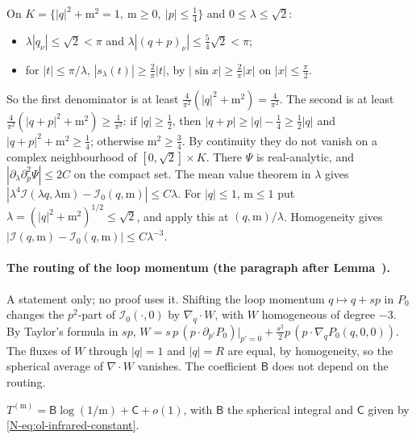 \begin{step}[Compactness]
On $K=\{|q|^2+\mathrm m^2=1,\ \mathrm m\ge0,\ |p|\le\frac14\}$ and $0\le\lambda\le\sqrt2$:
\begin{itemize}
\item $\lambda|q_\nu|\le\sqrt2<\pi$ and $\lambda|(q+p)_\nu|\le\frac54\sqrt2<\pi$;
\item for $|t|\le\pi/\lambda$, $|s_\lambda(t)|\ge\frac2\pi|t|$, by $|\sin x|\ge\frac2\pi|x|$ on $|x|\le\frac\pi2$.
\end{itemize}
So the first denominator is at least $\frac4{\pi^2}(|q|^2+\mathrm m^2)=\frac4{\pi^2}$. The second is at least $\frac4{\pi^2}(|q+p|^2+\mathrm m^2)\ge\frac1{\pi^2}$: if $|q|\ge\frac12$, then $|q+p|\ge|q|-\frac14\ge\frac12|q|$ and $|q+p|^2+\mathrm m^2\ge\frac14$; otherwise $\mathrm m^2\ge\frac34$. By continuity they do not vanish on a complex neighbourhood of $[0,\sqrt2]\times K$. There $\Psi$ is real-analytic, and $|\partial_\lambda\partial_p^2\Psi|\le2C$ on the compact set. The mean value theorem in $\lambda$ gives $|\lambda^4\mathcal I(\lambda q,\lambda\mathrm m)-\mathcal I_0(q,\mathrm m)|\le C\lambda$. For $|q|\le1$, $\mathrm m\le1$ put $\lambda=(|q|^2+\mathrm m^2)^{1/2}\le\sqrt2$, and apply this at $(q,\mathrm m)/\lambda$. Homogeneity gives $|\mathcal I(q,\mathrm m)-\mathcal I_0(q,\mathrm m)|\le C\lambda^{-3}$.
\end{step}

\paragraph{The routing of the loop momentum (the paragraph after Lemma~).} A statement only; no proof uses it. Shifting the loop momentum $q\mapsto q+sp$ in $P_0$ changes the $p^2$-part of $\mathcal I_0(\cdot,0)$ by $\nabla_q\cdot W$, with $W$ homogeneous of degree $-3$. By Taylor's formula in $sp$, $W=s\,p\,(p\cdot\partial_{p'}P_0)|_{p'=0}+\frac{s^2}2p\,(p\cdot\nabla_qP_0(q,0,0))$. The fluxes of $W$ through $|q|=1$ and $|q|=R$ are equal, by homogeneity, so the spherical average of $\nabla\cdot W$ vanishes. The coefficient $\mathsf B$ does not depend on the routing.

\begin{detail}\label{d11b:ol-infrared}
$T^{(\mathrm m)}=\mathsf B\log(1/\mathrm m)+\mathsf C+o(1)$, with $\mathsf B$ the spherical integral and $\mathsf C$ given by \eqref{N-eq:ol-infrared-constant}.
\end{detail}

